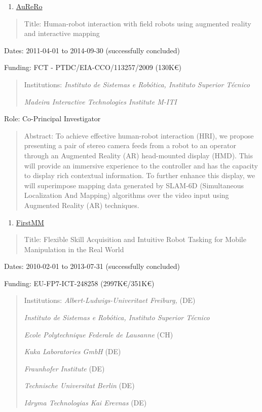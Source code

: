 \documentclass[
]{article}
\begin{document}
\begin{enumerate}
\def\labelenumi{\arabic{enumi}.}
\setcounter{enumi}{8}
\item
  \ul{AuReRo}
\end{enumerate}

\begin{quote}
Title: Human-robot interaction with field robots using augmented reality
and interactive mapping
\end{quote}

Dates: 2011-04-01 to 2014-09-30 (successfully concluded)

Funding: FCT - PTDC/EIA-CCO/113257/2009 (130K€)

\begin{quote}
Institutions: \emph{Instituto de Sistemas e Robótica, Instituto Superior
Técnico}

\emph{Madeira Interactive Technologies Institute M-ITI}
\end{quote}

Role: Co-Principal Investigator

\begin{quote}
Abstract: To achieve effective human-robot interaction (HRI), we propose
presenting a pair of stereo camera feeds from a robot to an operator
through an Augmented Reality (AR) head-mounted display (HMD). This will
provide an immersive experience to the controller and has the capacity
to display rich contextual information. To further enhance this display,
we will superimpose mapping data generated by SLAM-6D (Simultaneous
Localization And Mapping) algorithms over the video input using
Augmented Reality (AR) techniques.
\end{quote}

\begin{enumerate}
\def\labelenumi{\arabic{enumi}.}
\setcounter{enumi}{9}
\item
  \ul{FirstMM}
\end{enumerate}

\begin{quote}
Title: Flexible Skill Acquisition and Intuitive Robot Tasking for Mobile
Manipulation in the Real World
\end{quote}

Dates: 2010-02-01 to 2013-07-31 (successfully concluded)

Funding: EU-FP7-ICT-248258 (2997K€/351K€)

\begin{quote}
Institutions: \emph{Albert-Ludwigs-Univeritaet Freiburg,} (DE)

\emph{Instituto de Sistemas e Robótica, Instituto Superior Técnico}

\emph{Ecole Polytechnique Federale de Lausanne} (CH)

\emph{Kuka Laboratories GmbH} (DE)

\emph{Fraunhofer Institute} (DE)

\emph{Technische Universitat Berlin} (DE)

\emph{Idryma Technologias Kai Erevnas} (DE)
\end{quote}
\end{document}
